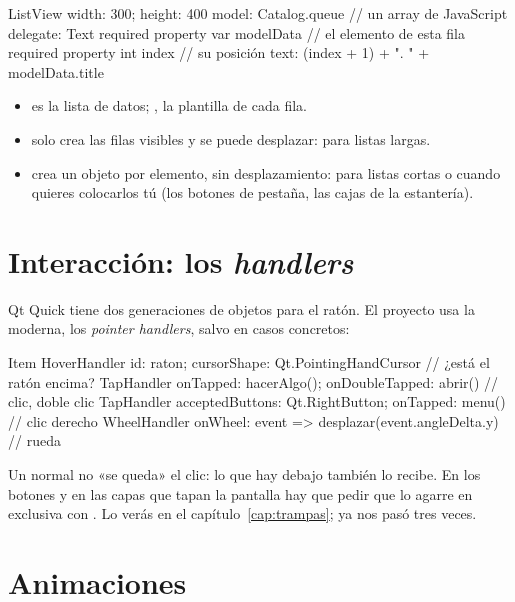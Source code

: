 \begin{qml}
ListView {
    width: 300; height: 400
    model: Catalog.queue                  // un array de JavaScript
    delegate: Text {
        required property var modelData  // el elemento de esta fila
        required property int index      // su posición
        text: (index + 1) + ". " + modelData.title
    }
}
\end{qml}

\begin{itemize}
  \item {} es la lista de datos; , la plantilla de cada fila.
  \item {} solo crea las filas visibles y se puede desplazar: para listas largas.
  \item {} crea un objeto por elemento, sin desplazamiento: para listas cortas o
  cuando quieres colocarlos tú (los botones de pestaña, las cajas de la estantería).
\end{itemize}

\section{Interacción: los \emph{handlers}}

Qt Quick tiene dos generaciones de objetos para el ratón. El proyecto usa la moderna, los
\emph{pointer handlers}, salvo en casos concretos:

\begin{qml}
Item {
    HoverHandler { id: raton; cursorShape: Qt.PointingHandCursor }   // ¿está el ratón encima?
    TapHandler { onTapped: hacerAlgo(); onDoubleTapped: abrir() }   // clic, doble clic
    TapHandler { acceptedButtons: Qt.RightButton; onTapped: menu() }  // clic derecho
    WheelHandler { onWheel: event => desplazar(event.angleDelta.y) }  // rueda
}
\end{qml}

\begin{trampa}
Un  normal no «se queda» el clic: lo que hay debajo también lo recibe. En los
botones y en las capas que tapan la pantalla hay que pedir que lo agarre en exclusiva con
. Lo verás en el
capítulo~\ref{cap:trampas}; ya nos pasó tres veces.
\end{trampa}

\section{Animaciones}

